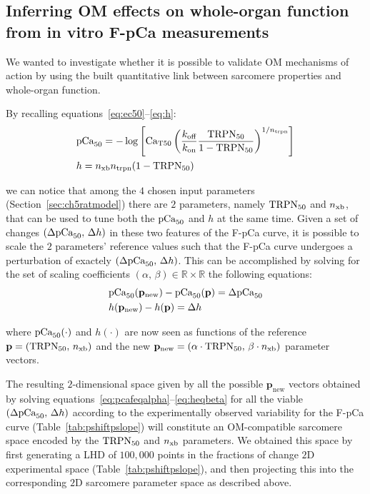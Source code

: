 %
%
%
\subsection{Inferring OM effects on whole-organ function from in vitro F-pCa measurements}\label{sec:ch5inferringomeffectswholeorganfpca}
We wanted to investigate whether it is possible to validate OM mechanisms of action by using the built quantitative link between sarcomere properties and whole-organ function.

\vspace{0.2cm}
By recalling equations~\eqref{eq:ec50}--\eqref{eq:h}:
%
\begin{align}
    & \textrm{pCa}_{50} = -\log\left[\textrm{Ca}_{\textrm{T}50}\left(\frac{k_{\textrm{off}}}{k_{\textrm{on}}}\frac{\textrm{TRPN}_{50}}{1-\textrm{TRPN}_{50}}\right)^{1/n_{\textrm{trpn}}}\right] \\
    & h = n_{\textrm{xb}}n_{\textrm{trpn}}(1-\textrm{TRPN}_{50})
\end{align}

\noindent
we can notice that among the $4$ chosen input parameters (Section~\ref{sec:ch5ratmodel}) there are $2$ parameters, namely $\textrm{TRPN}_{50}$ and $n_{\textrm{xb}}$, that can be used to tune both the $\textrm{pCa}_{50}$ and $h$ at the same time. Given a set of changes $(\Delta\textrm{pCa}_{50},\,\Delta h)$ in these two features of the F-pCa curve, it is possible to scale the $2$ parameters' reference values such that the F-pCa curve undergoes a perturbation of exactely $(\Delta\textrm{pCa}_{50},\,\Delta h)$. This can be accomplished by solving for the set of scaling coefficients $(\alpha,\,\beta)\in\mathbb{R}\times\mathbb{R}$ the following equations:
%
\begin{align}
    & \textrm{pCa}_{50}(\mathbf{p}_{\textrm{new}}) - \textrm{pCa}_{50}(\mathbf{p}) = \Delta\textrm{pCa}_{50} \label{eq:pcafeqalpha} \\
    & h(\mathbf{p}_{\textrm{new}}) - h(\mathbf{p}) = \Delta h \label{eq:heqbeta}
\end{align}

\vspace{0.2cm}\noindent
where $\textrm{pCa}_{50}(\cdot)$ and $h(\cdot)$ are now seen as functions of the reference $\mathbf{p}=(\textrm{TRPN}_{50},\,n_{\textrm{xb}})$ and the new $\mathbf{p}_{\textrm{new}}=(\alpha\cdot\textrm{TRPN}_{50},\,\beta\cdot n_{\textrm{xb}})$ parameter vectors.

\vspace{0.2cm}
The resulting $2$-dimensional space given by all the possible $\mathbf{p}_{\textrm{new}}$ vectors obtained by solving equations~\ref{eq:pcafeqalpha}--\ref{eq:heqbeta} for all the viable $(\Delta\textrm{pCa}_{50},\,\Delta h)$ according to the experimentally observed variability for the F-pCa curve (Table~\ref{tab:pshiftpslope}) will constitute an OM-compatible sarcomere space encoded by the $\textrm{TRPN}_{50}$ and $n_{\textrm{xb}}$ parameters. We obtained this space by first generating a LHD of $100,000$ points in the fractions of change $2$D experimental space (Table~\ref{tab:pshiftpslope}), and then projecting this into the corresponding $2$D sarcomere parameter space as described above.

